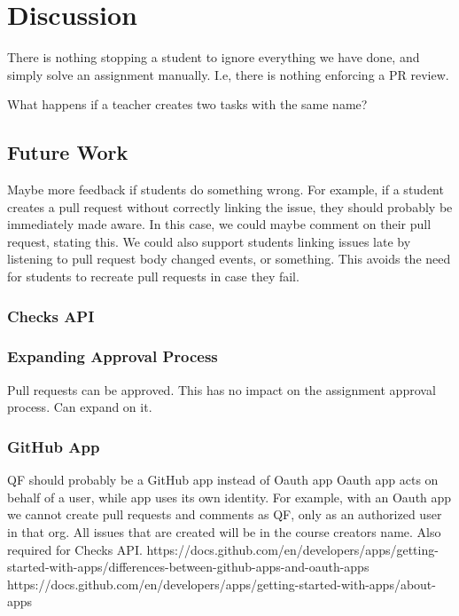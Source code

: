 
\chapter{Discussion}
\label{ch:discussion}

There is nothing stopping a student to ignore everything we have done, and simply solve an assignment manually.
I.e, there is nothing enforcing a PR review.

What happens if a teacher creates two tasks with the same name?

\section{Future Work}

Maybe more feedback if students do something wrong.
For example, if a student creates a pull request without correctly linking the issue, they should probably be immediately made aware.
In this case, we could maybe comment on their pull request, stating this.
We could also support students linking issues late by listening to pull request body changed events, or something.
This avoids the need for students to recreate pull requests in case they fail.

\subsection{Checks API}

\subsection{Expanding Approval Process}
Pull requests can be approved. This has no impact on the assignment approval process. Can expand on it.

\subsection{GitHub App}
\label{section:github-app}

QF should probably be a GitHub app instead of Oauth app
Oauth app acts on behalf of a user, while app uses its own identity.
For example, with an Oauth app we cannot create pull requests and comments as QF, only as an authorized user in that org.
All issues that are created will be in the course creators name.
Also required for Checks API.
https://docs.github.com/en/developers/apps/getting-started-with-apps/differences-between-github-apps-and-oauth-apps
https://docs.github.com/en/developers/apps/getting-started-with-apps/about-apps
